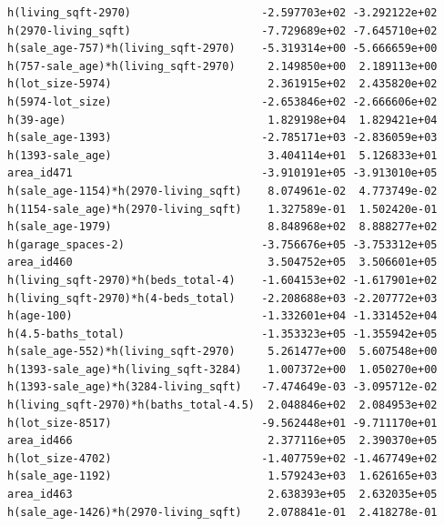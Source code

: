 \documentclass[
]{article}
\begin{document}
\begin{verbatim}
h(living_sqft-2970)                    -2.597703e+02 -3.292122e+02
h(2970-living_sqft)                    -7.729689e+02 -7.645710e+02
h(sale_age-757)*h(living_sqft-2970)    -5.319314e+00 -5.666659e+00
h(757-sale_age)*h(living_sqft-2970)     2.149850e+00  2.189113e+00
h(lot_size-5974)                        2.361915e+02  2.435820e+02
h(5974-lot_size)                       -2.653846e+02 -2.666606e+02
h(39-age)                               1.829198e+04  1.829421e+04
h(sale_age-1393)                       -2.785171e+03 -2.836059e+03
h(1393-sale_age)                        3.404114e+01  5.126833e+01
area_id471                             -3.910191e+05 -3.913010e+05
h(sale_age-1154)*h(2970-living_sqft)    8.074961e-02  4.773749e-02
h(1154-sale_age)*h(2970-living_sqft)    1.327589e-01  1.502420e-01
h(sale_age-1979)                        8.848968e+02  8.888277e+02
h(garage_spaces-2)                     -3.756676e+05 -3.753312e+05
area_id460                              3.504752e+05  3.506601e+05
h(living_sqft-2970)*h(beds_total-4)    -1.604153e+02 -1.617901e+02
h(living_sqft-2970)*h(4-beds_total)    -2.208688e+03 -2.207772e+03
h(age-100)                             -1.332601e+04 -1.331452e+04
h(4.5-baths_total)                     -1.353323e+05 -1.355942e+05
h(sale_age-552)*h(living_sqft-2970)     5.261477e+00  5.607548e+00
h(1393-sale_age)*h(living_sqft-3284)    1.007372e+00  1.050270e+00
h(1393-sale_age)*h(3284-living_sqft)   -7.474649e-03 -3.095712e-02
h(living_sqft-2970)*h(baths_total-4.5)  2.048846e+02  2.084953e+02
h(lot_size-8517)                       -9.562448e+01 -9.711170e+01
area_id466                              2.377116e+05  2.390370e+05
h(lot_size-4702)                       -1.407759e+02 -1.467749e+02
h(sale_age-1192)                        1.579243e+03  1.626165e+03
area_id463                              2.638393e+05  2.632035e+05
h(sale_age-1426)*h(2970-living_sqft)    2.078841e-01  2.418278e-01
                                                                  

\end{verbatim}
\end{document}
